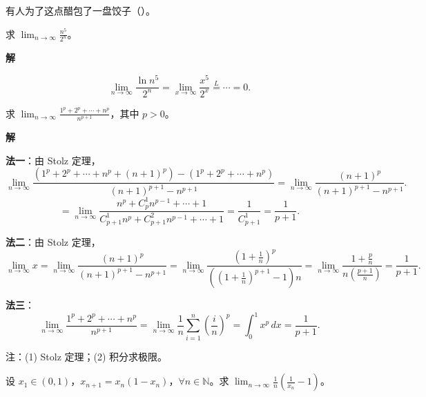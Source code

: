 \documentclass[lang=cn,chinesefont=founder,10pt]{elegantbook}
\renewenvironment{proof}[1][\proofname]{
  \par\noindent\textbf{\color{second}#1\;}\par\noindent
  \color{black!90}\cfs}{
  \par}
\begin{document}
\begin{remark}
    有人为了这点醋包了一盘饺子（）。
\end{remark}

\begin{example}
    求 $\displaystyle\lim_{n \to \infty} \frac{n^5}{2^n}$。
\end{example}

\begin{proof}[解]
    \[
        \lim_{n \to \infty} \frac{\ln n^5}{2^n}
        = \lim_{x \to \infty} \frac{x^5}{2^x}
        \stackrel{L}{=} \cdots = 0.
    \]
\end{proof}

\begin{example}
    求 $\displaystyle\lim_{n \to \infty} \frac{1^p + 2^p + \cdots + n^p}{n^{p+1}}$，其中 $p > 0$。
\end{example}

\begin{proof}[解]
    \textbf{法一}：由 Stolz 定理，
    \[
        \lim_{n \to \infty} \frac{(1^p + 2^p + \cdots + n^p + (n+1)^p) - (1^p + 2^p + \cdots + n^p)}{(n+1)^{p+1} - n^{p+1}}
        = \lim_{n \to \infty} \frac{(n+1)^p}{(n+1)^{p+1} - n^{p+1}}.
    \]
    \[
        = \lim_{n \to \infty} \frac{n^p + C_p^1 n^{p-1} + \cdots + 1}{C_{p+1}^1 n^p + C_{p+1}^2 n^{p-1} + \cdots + 1}
        = \frac{1}{C_{p+1}^1}
        = \frac{1}{p+1}.
    \]

    \textbf{法二}：由 Stolz 定理，
    \[
        \lim_{n \to \infty} x
        = \lim_{n \to \infty} \frac{(n+1)^p}{(n+1)^{p+1} - n^{p+1}}
        = \lim_{n \to \infty} \frac{\left(1 + \frac{1}{n}\right)^p}{\left(\left(1 + \frac{1}{n}\right)^{p+1} - 1\right) n}
        = \lim_{n \to \infty} \frac{1 + \frac{p}{n}}{n \left(\frac{p+1}{n}\right)}
        = \frac{1}{p+1}.
    \]

    \textbf{法三}：
    \[
        \lim_{n \to \infty} \frac{1^p + 2^p + \cdots + n^p}{n^{p+1}}
        = \lim_{n \to \infty} \frac{1}{n} \sum_{i=1}^{n} \left(\frac{i}{n}\right)^p
        = \int_0^1 x^p \, dx
        = \frac{1}{p+1}.
    \]
\end{proof}

\begin{remark}
    注：(1) Stolz 定理；(2) 积分求极限。
\end{remark}

\begin{example}
    设 $x_1 \in (0,1)$，$x_{n+1} = x_n(1-x_n)$，$\forall n \in \mathbb{N}$。求 $\displaystyle\lim_{n \to \infty} \frac{1}{n}\left(\frac{1}{x_n} - 1\right)$。
\end{example}
\end{document}
